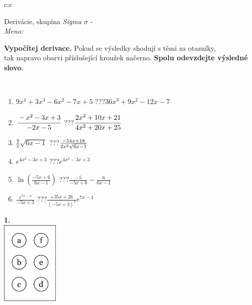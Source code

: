 \documentclass[10pt]{report}
\begin{document}
\begin{tabular}{c:c}
\begin{minipage}[c][104.5mm][t]{0.5\linewidth}
\begin{center}
\vspace{7mm}
{\huge Derivácie, skupina \textit{Sigma $\sigma$} -}\\[5mm]
\textit{Meno:}\phantom{xxxxxxxxxxxxxxxxxxxxxxxxxxxxxxxxxxxxxxxxxxxxxxxxxxxxxxxxxxxxxxxxx}\\[5mm]
\begin{minipage}{0.95\linewidth}
\begin{center}
\textbf{Vypočítej derivace.} Pokud se výsledky shodují s těmi za otazníky,\\tak napravo obarvi příslušející kroužek načerno. \textbf{Spolu odevzdejte výsledné slovo}.
\end{center}
\end{minipage}
\\[1mm]
\begin{minipage}{0.79\linewidth}
\begin{center}
\begin{varwidth}{\linewidth}
\begin{enumerate}
\normalsize
\item $9x^4+3x^3-6x^2-7x+5$\quad \dotfill\; ???\;\dotfill \quad $36x^3+9x^2-12x-7$
\item $\cfrac{-x^2-3x+3}{-2x-5}$\quad \dotfill\; ???\;\dotfill \quad $\cfrac{2x^2+10x+21}{4x^2+20x+25}$
\item $\frac{9}{x}\sqrt{6x-1}$\quad \dotfill\; ???\;\dotfill \quad $\frac{-54x+18}{2x^2 \sqrt{\smash[b]{6x-1}}}$
\item $e^{4x^2-3x+3}$\quad \dotfill\; ???\;\dotfill \quad $e^{4x^2-3x+3}$
\item $\ln{\left(\frac{-5x+6}{6x-1}\right)}$\quad \dotfill\; ???\;\dotfill \quad $\frac{-5}{-5x+6}-\frac{6}{6x-1}$
\item $\frac{e^{7x-4}}{-5x+3}$\quad \dotfill\; ???\;\dotfill \quad $\frac{+35x+26}{(-5x+3)^2}e^{7x-4}$
\end{enumerate}
\end{varwidth}
\end{center}
\end{minipage}
\begin{minipage}{0.20\linewidth}
\begin{center}
{\Huge\bfseries 1.} \\[2mm]
\includegraphics[height=40mm]{../images/braille.png}

\end{center}
\end{minipage}
\end{center}
\end{minipage}
\end{tabular}
\end{document}
